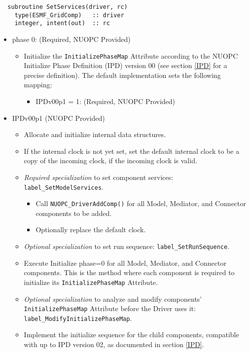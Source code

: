 \begin{verbatim}  subroutine SetServices(driver, rc)
    type(ESMF_GridComp)   :: driver
    integer, intent(out)  :: rc
\end{verbatim}

\begin{itemize}
\item phase 0: ({\sc Required, NUOPC Provided})
  \begin{itemize}
  \item Initialize the {\tt InitializePhaseMap} Attribute according to the NUOPC Initialize Phase Definition (IPD) version 00 (see section \ref{IPD} for a precise definition). The default implementation sets the following mapping:
    \begin{itemize}
    \item IPDv00p1 = 1: ({\sc Required, NUOPC Provided})
    \end{itemize}  
  \end{itemize}  
\item IPDv00p1 ({\sc NUOPC Provided})
  \begin{itemize}
  \item Allocate and initialize internal data structures.
  \item If the internal clock is not yet set, set the default internal clock to be a copy of the incoming clock, if the incoming clock is valid.
  \item {\it Required specialization} to set component services: {\tt label\_SetModelServices}.
  \begin{itemize}
    \item Call {\tt NUOPC\_DriverAddComp()} for all Model, Mediator, and Connector components to be added.
    \item Optionally replace the default clock. 
  \end{itemize}
  \item {\it Optional specialization} to set run sequence: {\tt label\_SetRunSequence}.

  \item Execute Initialize phase=0 for all Model, Mediator, and Connector components. This is the method where each component is required to initialize its {\tt InitializePhaseMap} Attribute.
  \item {\it Optional specialization} to analyze and modify components' {\tt InitializePhaseMap} Attribute before the Driver uses it: {\tt label\_ModifyInitializePhaseMap}.
  \item Implement the initialize sequence for the child components, compatible with up to IPD version 02, as documented in section \ref{IPD}.
  \end{itemize}  
\end{itemize}

